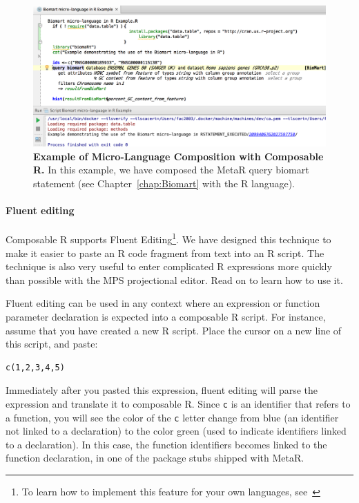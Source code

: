 \begin{figure}[h!tbp]
  \centering
  \includegraphics[width=\figWidthWide]{figures/ExampleRunningComposableRLanguageInMPS.png}
\caption[Example of Micro-Language Composition with Composable R.]{\textbf{Example of Micro-Language Composition with Composable R.} In this example, we have composed the MetaR query biomart statement (see Chapter~\ref{chap:Biomart} with the R language).}
\label{fig:ExampleRunningComposableRLanguageInMPS}
\end{figure}


\paragraph{Fluent editing}

Composable R supports Fluent Editing\footnote{To learn how to implement this feature for your own languages, see~\cite{campagne2015mps}}. We have designed this technique to make it easier to paste an R code fragment from text into an R script. The technique is also very useful to enter complicated R expressions more quickly than possible with the MPS  projectional editor. Read on to learn how to use it.

Fluent editing can be used in any context where an expression or function parameter declaration is expected into a composable R script.  For instance, assume that you have created a new R script. Place the cursor on a new line of this script, and  paste: 
\begin{lstlisting}
c(1,2,3,4,5)
\end{lstlisting}
Immediately after you pasted this expression, fluent editing will parse the expression and translate it to composable R. Since \texttt{c} is an identifier that refers to a function, you will see the color of the \texttt{c} letter change from blue (an identifier not linked to a declaration) to the color green  (used to indicate identifiers linked to a declaration). In this case, the function identifiers becomes linked to the function declaration, in one of the package stubs shipped with MetaR. 

